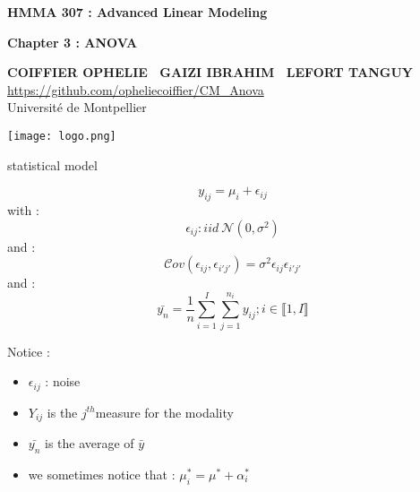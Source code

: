 \documentclass[unknownkeysallowed]{beamer}
\begin{document}



\begin{frame}
\bigskip
\bigskip
\begin{center}{
\LARGE\color{marron}
\textbf{HMMA 307 : Advanced Linear Modeling}
\textbf{ }\\
\vspace{0.5cm}
}

\color{marron}
\textbf{Chapter 3 : ANOVA}
\end{center}

\vspace{0.5cm}

\begin{center}
\textbf{COIFFIER OPHELIE \ GAIZI IBRAHIM \ LEFORT TANGUY } \\
\vspace{0.1cm}
\url{https://github.com/opheliecoiffier/CM_Anova}\\
\vspace{0.5cm}
Université de Montpellier \\
\end{center}

\centering
\texttt{[image: logo.png]}

\end{frame}
\begin{frame}
{statistical model}

$$
y_{ij}=\mu_i+\epsilon_{ij}
$$
with : $$ \epsilon_{ij} : iid ~\mathcal{N}(0,\sigma^2) $$
and : $$\mathcal{C}ov(\epsilon_{ij},\epsilon_{i'j'})=\sigma^2 \epsilon_{ij} \epsilon_{i'j'} $$
and : $$\bar{y_n}= \frac{1}{n} \sum\limits_{i=1}^I \sum\limits_{j=1}^{n_i}y_{ij} ; i\in \llbracket 1,I \rrbracket $$
 \begin{alertblock}{Notice :}
 \begin{itemize}
        \item $\epsilon_{ij}$ : noise
        \item $Y_{ij}$ is the $j^{th}$measure for the modality
        \item $\bar{y_n}$ is the average of $\bar{y}$
        \item we sometimes notice that : $\mu^*_i=\mu^*+\alpha^*_i $
    \end{itemize}
\end{alertblock}
\vspace{0.4cm}
\end{frame}
\end{document}

